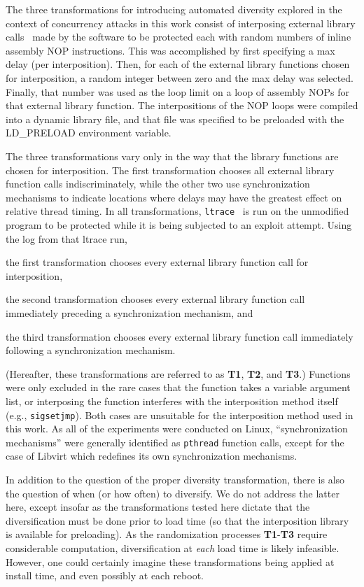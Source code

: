 The three transformations for introducing automated diversity explored in the context of concurrency attacks in this work consist of interposing external library calls~\cite{Conrad2009} made by the software to be protected each with random numbers of inline assembly NOP instructions.
This was accomplished by first specifying a max delay (per interposition).
Then, for each of the external library functions chosen for interposition, a random integer between zero and the max delay was selected.
Finally, that number was used as the loop limit on a loop of assembly NOPs for that external library function.
The interpositions of the NOP loops were compiled into a dynamic library file, and that file was specified to be preloaded with the LD\_PRELOAD environment variable.

The three transformations vary only in the way that the library functions are chosen for interposition.
The first transformation chooses all external library function calls indiscriminately, while the other two use synchronization mechanisms to indicate locations where delays may have the greatest effect on relative thread timing.
In all transformations, \texttt{ltrace}~\cite{cespedesltrace} is run on the unmodified program to be protected while it is being subjected to an exploit attempt.
Using the log from that ltrace run,
\begin{description}\addtolength{\itemsep}{-.35\baselineskip}
	\item[T1] the first transformation chooses every external library function call for interposition,
	\item[T2] the second transformation chooses every external library function call immediately preceding a synchronization mechanism, and
	\item[T3] the third transformation chooses every external library function call immediately following a synchronization mechanism.
\end{description}
(Hereafter, these transformations are referred to as \textbf{T1}, \textbf{T2}, and \textbf{T3}.)
Functions were only excluded in the rare cases that the function takes a
variable argument list, or interposing the function interferes with the
interposition method itself (e.g., \texttt{sigsetjmp}).
Both cases are unsuitable for the interposition method used in this work.
As all of the experiments were conducted on Linux, ``synchronization
mechanisms'' were generally identified as \texttt{pthread} function calls, except for the case of Libvirt which redefines its own synchronization mechanisms.

In addition to the question of the proper diversity transformation, there is also the question of when (or how often) to diversify.
We do not address the latter here, except insofar as the transformations tested here dictate that the diversification must be done prior to load time (so that the interposition library is available for preloading).
As the randomization processes \textbf{T1}-\textbf{T3} require considerable computation, diversification at \textit{each} load time is likely infeasible.
However, one could certainly imagine these transformations being applied at install time, and even possibly at each reboot.